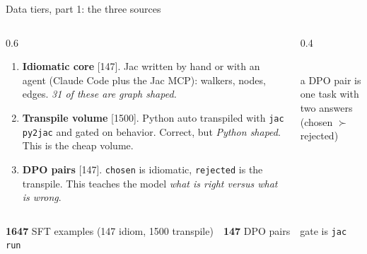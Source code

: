 \documentclass[aspectratio=169,11pt]{beamer}
\begin{document}
\begin{frame}{Data tiers, part 1: the three sources}
  \begin{columns}[t]
    \begin{column}{0.6\textwidth}
      \begin{enumerate}
        \item \textbf{Idiomatic core} [147]. Jac written by hand or with an agent (Claude
              Code plus the Jac MCP): walkers, nodes, edges. \emph{31 of these are graph shaped.}
        \item \textbf{Transpile volume} [1500]. Python auto transpiled with \texttt{jac py2jac}
              and gated on behavior. Correct, but \emph{Python shaped}. This is the cheap volume.
        \item \textbf{DPO pairs} [147]. \texttt{chosen} is idiomatic, \texttt{rejected} is the
              transpile. This teaches the model \emph{what is right versus what is wrong}.
      \end{enumerate}
    \end{column}
    \begin{column}{0.4\textwidth}
      \centering
      \\[2mm]{\scriptsize a DPO pair is one task with\\ two answers (chosen $\succ$ rejected)}
    \end{column}
  \end{columns}
  \vspace{2mm}
  \begin{center}\small
   \textbf{1647} SFT examples (147 idiom, 1500 transpile) \,\textbullet\, \textbf{147} DPO pairs
   \,\textbullet\, gate is \texttt{jac run}
  \end{center}
\end{frame}
\end{document}
